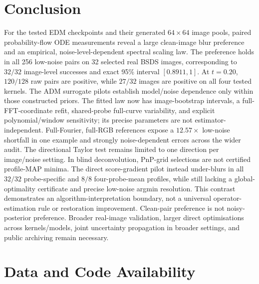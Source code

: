 \documentclass[10pt,journal]{IEEEtran}
\begin{document}
\section{Conclusion}
\label{sec:concl}

For the tested EDM checkpoints and their generated $64\times64$ image pools, paired
probability-flow ODE measurements reveal a large clean-image blur preference and an empirical,
noise-level-dependent spectral scaling law. The preference holds in all 256 low-noise pairs on
32 selected real BSDS images, corresponding to $32/32$ image-level successes and exact 95\%
interval $[0.8911,1]$. At $t=0.20$, $120/128$ raw pairs are positive, while $27/32$ images are
positive on all four tested kernels. The ADM surrogate pilots establish model/noise dependence
only within those constructed priors. The fitted law now has image-bootstrap intervals, a
full-FFT-coordinate refit, shared-probe full-curve variability, and explicit polynomial/window
sensitivity; its precise parameters are not estimator-independent. Full-Fourier, full-RGB
references expose a $12.57\times$ low-noise shortfall in one example and strongly noise-dependent
errors across the wider audit. The directional Taylor test remains limited to one direction per
image/noise setting. In blind deconvolution, PnP-grid selections are not certified profile-MAP
minima. The direct score-gradient pilot instead under-blurs in all $32/32$ probe-specific and
$8/8$ four-probe-mean profiles, while still lacking a global-optimality certificate and precise
low-noise argmin resolution. This contrast demonstrates an algorithm-interpretation boundary,
not a universal operator-estimation rule or restoration improvement. Clean-pair preference is
not noisy-posterior preference. Broader real-image validation, larger direct optimisations
across kernels/models, joint uncertainty propagation in broader settings, and public archiving
remain necessary.

\section*{Data and Code Availability}
\end{document}
